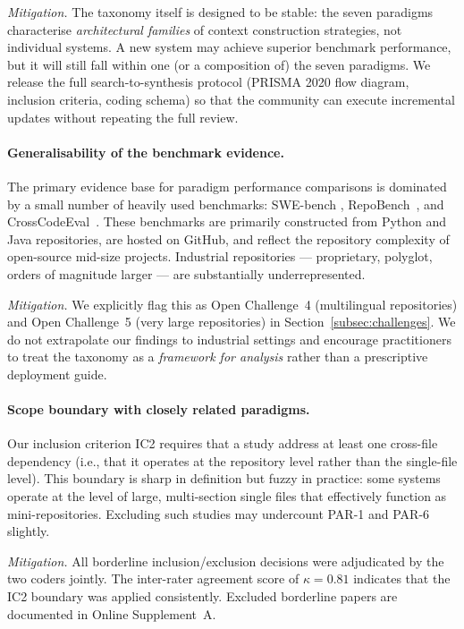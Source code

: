 \emph{Mitigation.}
The taxonomy itself is designed to be stable: the seven paradigms characterise
\emph{architectural families} of context construction strategies, not
individual systems.
A new system may achieve superior benchmark performance, but it will still
fall within one (or a composition of) the seven paradigms.
We release the full search-to-synthesis protocol (PRISMA 2020 flow diagram,
inclusion criteria, coding schema) so that the community can execute
incremental updates without repeating the full review.

\paragraph{Generalisability of the benchmark evidence.}
The primary evidence base for paradigm performance comparisons is dominated by
a small number of heavily used benchmarks: SWE-bench
\cite{jimenez2024swebench}, RepoBench~\cite{liu2024repobench}, and
CrossCodeEval~\cite{ding2023crosscodeeval}.
These benchmarks are primarily constructed from Python and Java repositories,
are hosted on GitHub, and reflect the repository complexity of open-source
mid-size projects.
Industrial repositories — proprietary, polyglot, orders of magnitude larger
— are substantially underrepresented.

\emph{Mitigation.}
We explicitly flag this as Open Challenge~4 (multilingual repositories) and
Open Challenge~5 (very large repositories) in Section~\ref{subsec:challenges}.
We do not extrapolate our findings to industrial settings and encourage
practitioners to treat the taxonomy as a \emph{framework for analysis}
rather than a prescriptive deployment guide.

\paragraph{Scope boundary with closely related paradigms.}
Our inclusion criterion IC2 requires that a study address at least one
cross-file dependency (i.e., that it operates at the repository level rather
than the single-file level).
This boundary is sharp in definition but fuzzy in practice: some systems
operate at the level of large, multi-section single files that effectively
function as mini-repositories.
Excluding such studies may undercount PAR-1 and PAR-6 slightly.

\emph{Mitigation.}
All borderline inclusion/exclusion decisions were adjudicated by the two
coders jointly.
The inter-rater agreement score of $\kappa = 0.81$ indicates that the IC2
boundary was applied consistently.
Excluded borderline papers are documented in Online Supplement~A.
